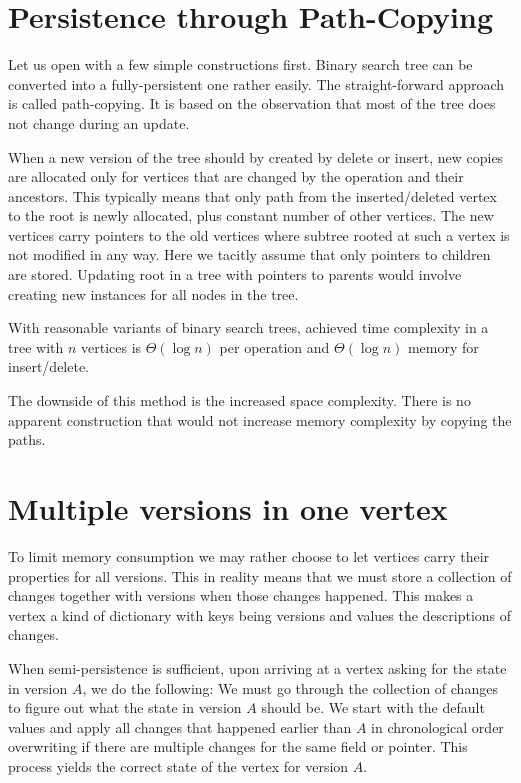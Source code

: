 \section{Persistence through Path-Copying}

Let us open with a few simple constructions first. Binary search tree can be converted into a fully-persistent one rather easily.
The straight-forward approach is called path-copying. It is based on the observation that most of the tree does not change during an update.

When a new version of the tree should by created by delete or insert, new copies are allocated only for vertices that are changed by the operation and their ancestors. 
This typically means that only path from the inserted/deleted vertex to the root is newly allocated, plus constant number of other vertices. 
The new vertices carry pointers to the old vertices where subtree rooted at such a vertex is not modified in any way.
Here we tacitly assume that only pointers to children are stored. Updating root in a tree with pointers to parents would involve creating new instances for all nodes in the tree.

With reasonable variants of binary search trees, achieved time complexity in a tree with $n$ vertices is $\Theta(\log n)$ per operation and $\Theta(\log n)$ memory for insert/delete.

The downside of this method is the increased space complexity. There is no apparent construction that would not increase memory complexity by copying the paths.

\section{Multiple versions in one vertex}

To limit memory consumption we may rather choose to let vertices carry their properties for all versions. This in reality means that we must store a collection of changes together with versions when those changes happened. This makes a vertex a kind of dictionary with keys being versions and values the descriptions of changes.

When semi-persistence is sufficient, upon arriving at a vertex asking for the state in version $A$, we do the following: We must go through the collection of changes to figure out what the state in version $A$ should be. 
We start with the default values and apply all changes that happened earlier than $A$ in chronological order overwriting if there are multiple changes for the same field or pointer. 
This process yields the correct state of the vertex for version $A$. 


